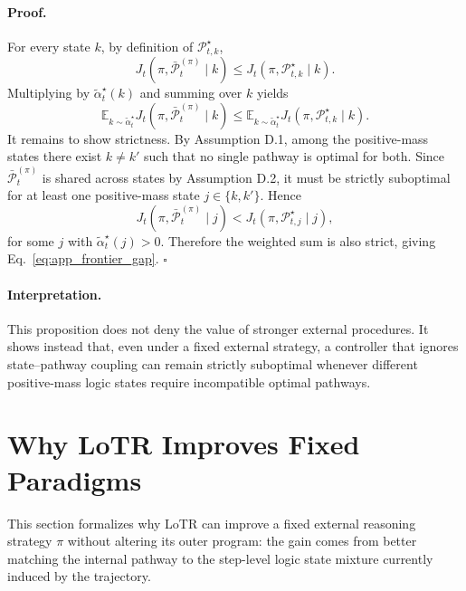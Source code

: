 \paragraph{Proof.}
For every state \(k\), by definition of \(\mathcal{P}_{t,k}^{\star}\),
\begin{equation}
J_t(\pi,\bar{\mathcal{P}}_t^{(\pi)}\mid k)
\le
J_t(\pi,\mathcal{P}_{t,k}^{\star}\mid k).
\label{eq:app_frontier_pointwise}
\end{equation}
Multiplying by \(\tilde{\alpha}_t^\star(k)\) and summing over \(k\) yields
\[
\mathbb{E}_{k\sim \tilde{\alpha}_t^\star}
J_t(\pi,\bar{\mathcal{P}}_t^{(\pi)}\mid k)
\le
\mathbb{E}_{k\sim \tilde{\alpha}_t^\star}
J_t(\pi,\mathcal{P}_{t,k}^{\star}\mid k).
\]
It remains to show strictness. By Assumption D.1, among the positive-mass states there exist \(k\neq k'\) such that no single pathway is optimal for both. Since \(\bar{\mathcal{P}}_t^{(\pi)}\) is shared across states by Assumption D.2, it must be strictly suboptimal for at least one positive-mass state \(j\in\{k,k'\}\). Hence
\[
J_t(\pi,\bar{\mathcal{P}}_t^{(\pi)}\mid j)
<
J_t(\pi,\mathcal{P}_{t,j}^{\star}\mid j),
\]
for some \(j\) with \(\tilde{\alpha}_t^\star(j)>0\). Therefore the weighted sum is also strict, giving Eq.~\eqref{eq:app_frontier_gap}. \(\square\)

\paragraph{Interpretation.}
This proposition does not deny the value of stronger external procedures. It shows instead that, even under a fixed external strategy, a controller that ignores state--pathway coupling can remain strictly suboptimal whenever different positive-mass logic states require incompatible optimal pathways.

\section{Why LoTR Improves Fixed Paradigms}
\label{app:theory_improve}

This section formalizes why LoTR can improve a fixed external reasoning strategy \(\pi\) without altering its outer program: the gain comes from better matching the internal pathway to the step-level logic state mixture currently induced by the trajectory.

